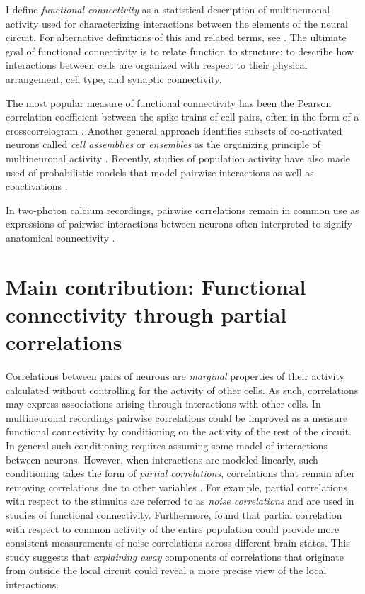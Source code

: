 I define \emph{functional connectivity} as a statistical description of multineuronal activity used for characterizing interactions between the elements of the neural circuit. 
For alternative definitions of this and related terms, see \cite{Feldt:2011,Friston:2011}. The ultimate goal of functional connectivity is to relate function to structure: to describe how interactions between cells are organized with respect to their physical arrangement, cell type, and synaptic connectivity.

The most popular measure of functional connectivity has been the Pearson correlation coefficient between the spike trains of cell pairs, often in the form of a crosscorrelogram \citep{Gerstein:1964,Gerstein:1969,Smith:2008,Denman:2013,Smith:2013,Smith:2013b,Sadovsky:2014}. 
Another general approach identifies subsets of co-activated neurons called \emph{cell assemblies} or \emph{ensembles} as the organizing principle of multineuronal activity \citep{Gerstein:1989,Kenet:2003,Harris:2005,Ch:2010,Miller:2014}.  
Recently, studies of population activity have also made used of probabilistic models that model pairwise interactions as well as coactivations \citep{Stevenson:2008,Pillow:2008,Hertz:2011,Ganmor:2011,Koster:2013,Tkacik:2013}.

In two-photon calcium recordings, pairwise correlations remain in common use as expressions of pairwise interactions between neurons often interpreted to signify anatomical connectivity \citep{Golshani:2009,Hofer:2011,Malmersjo:2013,Sadovsky:2014}.


\section{Main contribution: Functional connectivity through partial correlations}
Correlations between pairs of neurons are \emph{marginal} properties of their activity calculated without controlling for the activity of other cells. 
As such, correlations may express associations arising through interactions with other cells. 
In multineuronal recordings pairwise correlations could be improved as a measure functional connectivity by conditioning on the activity of the rest of the circuit. 
In general such conditioning requires assuming some model of interactions between neurons. 
However, when interactions are modeled linearly, such conditioning takes the form of \emph{partial correlations}, \ie correlations that remain after removing correlations due to other variables \citep{Whittaker:1990}. 
For example, partial correlations with respect to the stimulus are referred to as \emph{noise correlations} and are used in studies of functional connectivity. 
Furthermore, \cite{Ecker:2014} found that partial correlation with respect to common activity of the entire population could provide more consistent measurements of noise correlations across different brain states. 
This study suggests that \emph{explaining away} components of correlations that originate from outside the local circuit could reveal a more precise view of the local interactions. 

